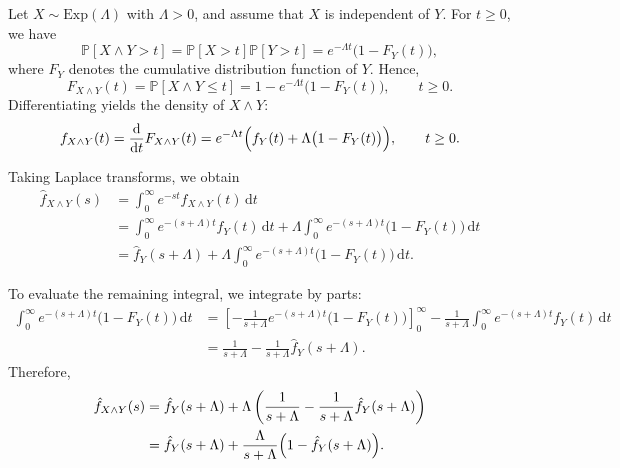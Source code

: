 \documentclass[11pt]{article}
\newenvironment{proof}{\noindent{\it Proof.}}{\hfill\fbox{}\vspace*{1mm}}
\begin{document}
\begin{proof}
Let $X\sim \mathrm{Exp}(\Lambda)$ with $\Lambda>0$, and assume that $X$ is independent of $Y$. 
For $t\geq 0$, we have
\begin{equation}
    \mathbb{P}[X\wedge Y>t]
    =
    \mathbb{P}[X>t]\mathbb{P}[Y>t]
    =
    e^{-\Lambda t}\bigl(1-F_Y(t)\bigr),
\end{equation}
where $F_Y$ denotes the cumulative distribution function of $Y$. Hence,
\begin{equation}
    F_{X\wedge Y}(t)
    =
    \mathbb{P}[X\wedge Y\leq t]
    =
    1-e^{-\Lambda t}\bigl(1-F_Y(t)\bigr),
    \qquad t\geq 0.
\end{equation}
Differentiating yields the density of $X\wedge Y$:
\begin{equation}
    f_{X\wedge Y}(t)
    =
    \frac{\mathrm{d}}{\mathrm{d}t}F_{X\wedge Y}(t)
    =
    e^{-\Lambda t}\Bigl(f_Y(t)+\Lambda\bigl(1-F_Y(t)\bigr)\Bigr),
    \qquad t\geq 0.
\end{equation}

Taking Laplace transforms, we obtain
\begin{equation}
\begin{aligned}
    \hat{f}_{X\wedge Y}(s)
    &=
    \int_{0}^{\infty} e^{-st} f_{X\wedge Y}(t)\,\mathrm{d}t\\
    &=
    \int_{0}^{\infty} e^{-(s+\Lambda)t}f_Y(t)\,\mathrm{d}t
    +
    \Lambda
    \int_{0}^{\infty} e^{-(s+\Lambda)t}\bigl(1-F_Y(t)\bigr)\,\mathrm{d}t\\
    &=
    \hat{f}_Y(s+\Lambda)
    +
    \Lambda
    \int_{0}^{\infty} e^{-(s+\Lambda)t}\bigl(1-F_Y(t)\bigr)\,\mathrm{d}t.
\end{aligned}
\end{equation}

To evaluate the remaining integral, we integrate by parts:
\begin{equation}
\begin{aligned}
    \int_{0}^{\infty} e^{-(s+\Lambda)t}\bigl(1-F_Y(t)\bigr)\,\mathrm{d}t
    &=
    \left[
    -\frac{1}{s+\Lambda}e^{-(s+\Lambda)t}\bigl(1-F_Y(t)\bigr)
    \right]_{0}^{\infty}
    -
    \frac{1}{s+\Lambda}
    \int_{0}^{\infty} e^{-(s+\Lambda)t} f_Y(t)\,\mathrm{d}t\\
    &=
    \frac{1}{s+\Lambda}
    -
    \frac{1}{s+\Lambda}\hat{f}_Y(s+\Lambda).
\end{aligned}
\end{equation}
Therefore,
\begin{equation}
\begin{aligned}
    \hat{f}_{X\wedge Y}(s)
    &=
    \hat{f}_Y(s+\Lambda)
    +
    \Lambda\left(
    \frac{1}{s+\Lambda}
    -
    \frac{1}{s+\Lambda}\hat{f}_Y(s+\Lambda)
    \right)\\
    &=
    \hat{f}_Y(s+\Lambda)
    +
    \frac{\Lambda}{s+\Lambda}
    \Bigl(1-\hat{f}_Y(s+\Lambda)\Bigr).
\end{aligned}
\end{equation}
\end{proof}

 
 
\nocite{*}
\end{document}
